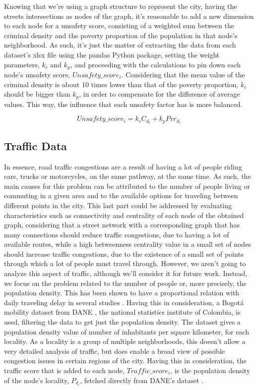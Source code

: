 \documentclass[runningheads]{llncs}
\begin{document}
Knowing that we're using a graph structure to represent the city, having the streets intersections as nodes of the graph, it's reasonable to add a new dimension to each node for a unsafety score, consisting of a weighted sum between the criminal density and the poverty proportion of the population in that node's neighborhood. As such, it's just the matter of extracting the data from each dataset's xlsx file using the pandas Python package, setting the weight parameters, $k_{c}$ and $k_{p}$, and proceeding with the calculations to pin down each node's unsafety score, $Unsafety\_score_i$. Considering that the mean value of the criminal density is about 10 times lower than that of the poverty proportion, $k_{c}$ should be bigger than $k_{p}$, in order to compensate for the difference of average values. This way, the influence that each unsafety factor has is more balanced.

$$Unsafety\_score_i = k_{c} C_{d_i} + k_{p} Pvr_{d_i}$$


\subsection{Traffic Data}

In essence, road traffic congestions are a result of having a lot of people riding cars, trucks or motorcycles, on the same pathway, at the same time. As such, the main causes for this problem can be attributed to the number of people living or commuting in a given area and to the available options for traveling between different points in the city. This last part could be addressed by evaluating characteristics such as connectivity and centrality of each node of the obtained graph, considering that a street network with a corresponding graph that has many connections should reduce traffic congestions, due to having a lot of available routes, while a high betweenness centrality value in a small set of nodes should increase traffic congestions, due to the existence of a small set of points through which a lot of people must travel through. However, we aren't going to analyze this aspect of traffic, although we'll consider it for future work. Instead, we focus on the problem related to the number of people or, more precisely, the population density. This has been shown to have a proportional relation with daily traveling delay in several studies \cite{levinson_network_2012} \cite{louf_how_2014}. Having this in consideration, a Bogotá mobility dataset from DANE \cite{gobierno_de_colombia_dane_nodate}, the national statistics institute of Colombia, is used, filtering the data to get just the population density. The dataset gives a population density value of number of inhabitants per square kilometer, for each locality. As a locality is a group of multiple neighborhoods, this doesn't allow a very detailed analysis of traffic, but does enable a broad view of possible congestion issues in certain regions of the city. Having this in consideration, the traffic score that is added to each node, $Traffic\_score_i$, is the population density of the node's locality, $P_{d_i}$, fetched directly from DANE's dataset \cite{gobierno_de_colombia_dane_nodate}.
\end{document}

